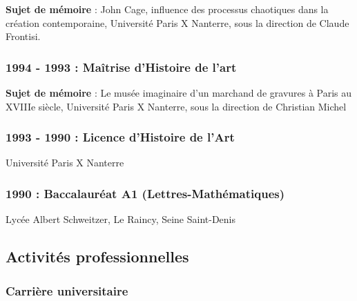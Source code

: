 \documentclass[
  a4paper,
  DIV=11,
  numbers=noendperiod]{scrreprt}
\begin{document}
\textbf{Sujet de mémoire} : John Cage, influence des processus
chaotiques dans la création contemporaine, Université Paris X Nanterre,
sous la direction de Claude Frontisi.

\subsubsection*{1994 - 1993 : Maîtrise d'Histoire de
l'art}\label{sec-item299343}

\textbf{Sujet de mémoire} : Le musée imaginaire d'un marchand de
gravures à Paris au XVIIIe siècle, Université Paris X Nanterre, sous la
direction de Christian Michel

\subsubsection*{1993 - 1990 : Licence d'Histoire de
l'Art}\label{sec-item428891}

Université Paris X Nanterre

\subsubsection*{1990 : Baccalauréat A1
(Lettres-Mathématiques)}\label{baccalauruxe9at-a1-lettres-mathuxe9matiques}

Lycée Albert Schweitzer, Le Raincy, Seine Saint-Denis

\subsection{Activités
professionnelles}\label{activituxe9s-professionnelles}

\subsubsection{Carrière
universitaire}\label{carriuxe8re-universitaire-1}
\end{document}
